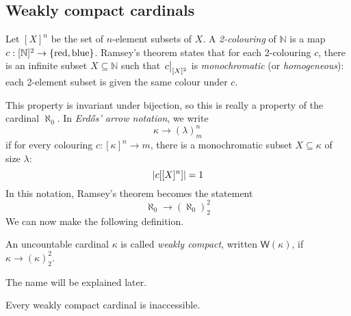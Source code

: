 \subsection{Weakly compact cardinals}
Let \( [X]^n \) be the set of \( n \)-element subsets of \( X \).
A \emph{2-colouring} of \( \mathbb N \) is a map \( c : [\mathbb N]^2 \to \qty{\text{red}, \text{blue}} \).
Ramsey's theorem states that for each 2-colouring \( c \), there is an infinite subset \( X \subseteq \mathbb N \) such that \( \eval{c}_{[X]^2} \) is \emph{monochromatic} (or \emph{homogeneous}): each 2-element subset is given the same colour under \( c \).

This property is invariant under bijection, so this is really a property of the cardinal \( \aleph_0 \).
In \emph{Erd\H{o}s' arrow notation}, we write
\[ \kappa \to (\lambda)_m^n \]
if for every colouring \( c : [\kappa]^n \to m \), there is a monochromatic subset \( X \subseteq \kappa \) of size \( \lambda \):
\[ \abs{c[[X]^n]} = 1 \]
In this notation, Ramsey's theorem becomes the statement
\[ \aleph_0 \to (\aleph_0)_2^2 \]
We can now make the following definition.
\begin{definition}
    An uncountable cardinal \( \kappa \) is called \emph{weakly compact}, written \( \mathsf{W}(\kappa) \), if \( \kappa \to (\kappa)_2^2 \).
\end{definition}
The name will be explained later.
\begin{theorem}[Erd\H{o}s]
    Every weakly compact cardinal is inaccessible.
\end{theorem}
